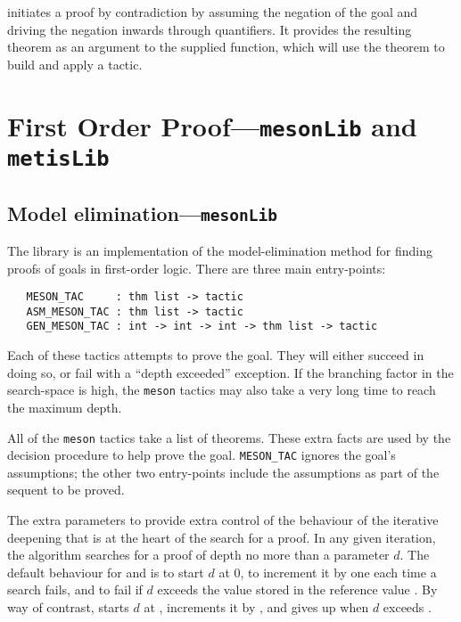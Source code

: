  initiates a proof by contradiction by assuming
the negation of the goal and driving the negation inwards through
quantifiers. It provides the resulting theorem as an argument to the
supplied function, which will use the theorem to build and apply a
tactic.

\section{First Order Proof---\texttt{mesonLib} and \texttt{metisLib}}
\label{sec:mesonLib}


\subsection{Model elimination---\texttt{mesonLib}}


The  library is an implementation of the
model-elimination method for finding proofs of goals in first-order
logic.  There are three main entry-points:

\begin{verbatim}
   MESON_TAC     : thm list -> tactic
   ASM_MESON_TAC : thm list -> tactic
   GEN_MESON_TAC : int -> int -> int -> thm list -> tactic
\end{verbatim}

Each of these tactics attempts to prove the goal.  They will either
succeed in doing so, or fail with a ``depth exceeded'' exception.  If
the branching factor in the search-space is high, the \texttt{meson}
tactics may also take a very long time to reach the maximum depth.

All of the \texttt{meson} tactics take a list of theorems.  These
extra facts are used by the decision procedure to help prove the goal.
\texttt{MESON\_TAC} ignores the goal's assumptions; the other two
entry-points include the assumptions as part of the sequent to be
proved.

The extra parameters to  provide extra control of
the behaviour of the iterative deepening that is at the heart of the
search for a proof.  In any given iteration, the algorithm searches
for a proof of depth no more than a parameter $d$.  The default
behaviour for  and  is to start $d$
at 0, to increment it by one each time a search fails, and to fail if
$d$ exceeds the value stored in the reference value
.  By way of contrast,
 starts $d$ at , increments
it by , and gives up when $d$ exceeds .

